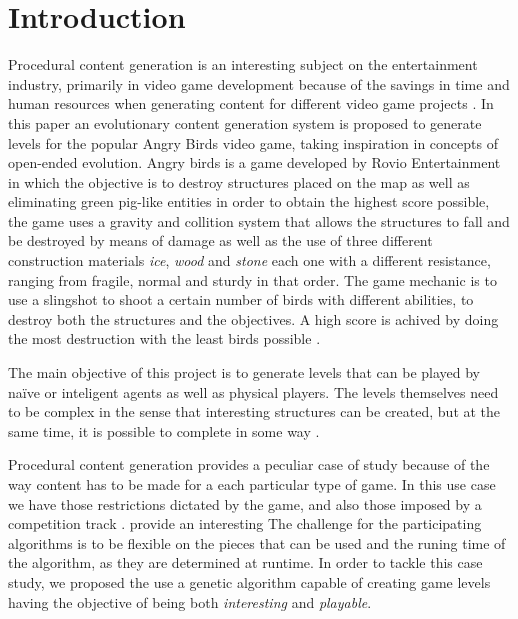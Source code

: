 \documentclass[conference]{IEEEtran}
\begin{document}
    \section{Introduction}
    Procedural content generation is an interesting subject on the entertainment
    industry, primarily in video game development because of the savings in 
    time and human resources when generating content for different video game projects \cite{Yannakakis2017,YannakakisContentGeneration}.
    In this paper an evolutionary content generation system is proposed to generate
    levels for the popular Angry Birds video game,
    taking inspiration in concepts of open-ended evolution. Angry birds is a game 
    developed by Rovio Entertainment in which the objective is to destroy structures
    placed on the map as well as eliminating
    green pig-like entities in order to obtain the highest score possible, the game
    uses a gravity and collition system that allows the structures to fall and be
    destroyed by means of damage as well as the use of three different construction
    materials \textit{ice}, \textit{wood} and \textit{stone} each one with a different
    resistance, ranging from fragile, normal and sturdy in that order. The game
    mechanic is to use a slingshot to shoot a certain number of birds with different
    abilities, to destroy both the structures and the objectives. A high score 
    is achived by doing the most destruction with the least birds possible 
    \cite{RovioEntertainmentCorporation2009}.
    
    The main objective of this project is to generate levels that can be played
    by naïve or inteligent agents as well as physical players. The levels
    themselves need to be complex in the sense that interesting structures can be
    created, but at the same time, it is possible to complete in some way
    \cite{Stephenson,Stephenson2018}.
    
    Procedural content generation provides a peculiar case of study because of the
    way
    content has to be made for a each particular type of game. In this use case we
    have those restrictions dictated by the game, and also those imposed by a
    competition track \cite{Renz}.%
    provide an interesting The challenge for the participating algorithms is to be
    flexible on the pieces that can be used and the runing time of the algorithm, as
    they are determined at runtime. 
    In order to tackle this case study, we proposed the use a genetic algorithm
    capable of creating game levels having the objective of being both
    \textit{interesting} and \textit{playable}.
    
\end{document}
